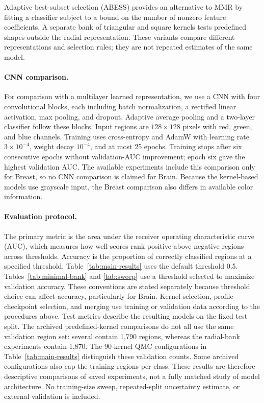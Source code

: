 \documentclass[10pt,twocolumn]{article}
\begin{document}
Adaptive best-subset selection (ABESS) \cite{zhu2020} provides an alternative to MMR by fitting a classifier subject to a bound on the number of nonzero feature coefficients. A separate bank of triangular and square kernels tests predefined shapes outside the radial representation. These variants compare different representations and selection rules; they are not repeated estimates of the same model.

\paragraph{CNN comparison.}
For comparison with a multilayer learned representation, we use a CNN with four convolutional blocks, each including batch normalization, a rectified linear activation, max pooling, and dropout. Adaptive average pooling and a two-layer classifier follow these blocks. Input regions are $128\times128$ pixels with red, green, and blue channels. Training uses cross-entropy and AdamW with learning rate $3\times10^{-4}$, weight decay $10^{-4}$, and at most 25 epochs. Training stops after six consecutive epochs without validation-AUC improvement; epoch six gave the highest validation AUC. The available experiments include this comparison only for Breast, so no CNN comparison is claimed for Brain. Because the kernel-based models use grayscale input, the Breast comparison also differs in available color information.

\paragraph{Evaluation protocol.}
The primary metric is the area under the receiver operating characteristic curve (AUC), which measures how well scores rank positive above negative regions across thresholds. Accuracy is the proportion of correctly classified regions at a specified threshold. Table~\ref{tab:main-results} uses the default threshold 0.5. Tables~\ref{tab:minimal-bank} and \ref{tab:sweep} use a threshold selected to maximize validation accuracy. These conventions are stated separately because threshold choice can affect accuracy, particularly for Brain. Kernel selection, profile-checkpoint selection, and merging use training or validation data according to the procedures above. Test metrics describe the resulting models on the fixed test split. The archived predefined-kernel comparisons do not all use the same validation region set: several contain 1,790 regions, whereas the radial-bank experiments contain 1,870. The 90-kernel QMC configurations in Table~\ref{tab:main-results} distinguish these validation counts. Some archived configurations also cap the training regions per class. These results are therefore descriptive comparisons of saved experiments, not a fully matched study of model architecture. No training-size sweep, repeated-split uncertainty estimate, or external validation is included.
\end{document}
